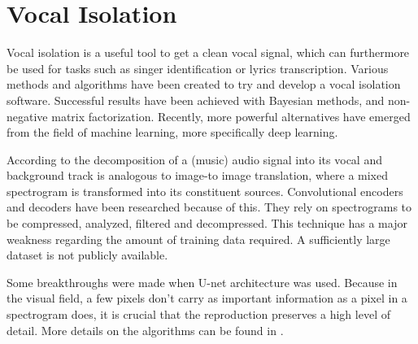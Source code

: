 \documentclass[../Thesis.tex]{subfiles}
\begin{document}
\section {Vocal Isolation}
Vocal isolation is a useful tool to get a clean vocal signal, which can furthermore be used for tasks such as singer identification or lyrics transcription. Various methods and algorithms have been created to try and develop a vocal isolation software. Successful results have been achieved with Bayesian methods, and non-negative matrix factorization. Recently, more powerful alternatives have emerged from the field of machine learning, more specifically deep learning.

According to \cite{jan} the decomposition of a (music) audio signal into its vocal and background track is analogous to image-to image translation, where a mixed spectrogram is transformed into its constituent sources. Convolutional encoders and decoders have been researched because of this. They rely on spectrograms to be compressed, analyzed, filtered and decompressed. This technique has a major weakness regarding the amount of training data required. A sufficiently large dataset is not publicly available.

Some breakthroughs were made when U-net architecture was used. Because in the visual field, a few pixels don’t carry as important information as a pixel in a spectrogram does, it is crucial that the reproduction preserves a high level of detail. More details on the algorithms can be found in \cite{jan}.
\end{document}
